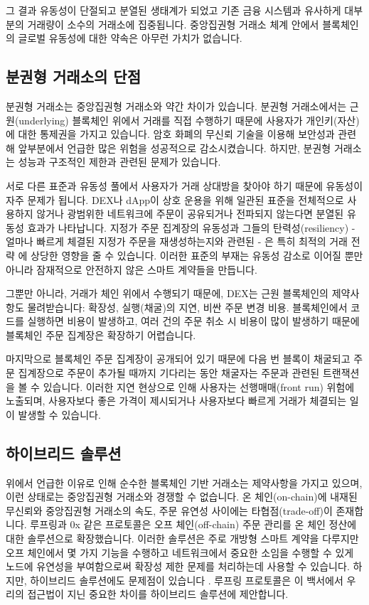 \documentclass[UTF8,nofonts]{article}
\begin{document}
\begin{multicols}{2}
그 결과 유동성이 단절되고 분열된 생태계가 되었고 기존 금융 시스템과 유사하게 대부분의 거래량이 소수의 거래소에 집중됩니다. 중앙집권형 거래소 체계 안에서 블록체인의 글로벌 유동성에 대한 약속은 아무런 가치가 없습니다.  

\subsection{분권형 거래소의 단점}
분권형 거래소는 중앙집권형 거래소와 약간 차이가 있습니다. 분권형 거래소에서는 근원(underlying) 블록체인 위에서 거래를 직접 수행하기 때문에 사용자가 개인키(자산)에 대한 통제권을 가지고 있습니다. 암호 화폐의 무신뢰 기술을 이용해 보안성과 관련해 앞부분에서 언급한 많은 위험을 성공적으로 감소시켰습니다. 하지만, 분권형 거래소는 성능과 구조적인 제한과 관련된 문제가 있습니다.

서로 다른 표준과 유동성 풀에서 사용자가 거래 상대방을 찾아야 하기 때문에 유동성이 자주 문제가 됩니다. DEX나 dApp이 상호 운용을 위해 일관된 표준을 전체적으로 사용하지 않거나 광범위한 네트워크에 주문이 공유되거나 전파되지 않는다면 분열된 유동성 효과가 나타납니다. 지정가 주문 집계장의 유동성과 그들의 탄력성(resiliency) - 얼마나 빠르게 체결된 지정가 주문을 재생성하는지와 관련된 - 은 특히 최적의 거래 전략 \cite{limitorderliquidity} 에 상당한 영향을 줄 수 있습니다. 이러한 표준의 부재는 유동성 감소로 이어질 뿐만 아니라 잠재적으로 안전하지 않은 스마트 계약들을 만듭니다.

그뿐만 아니라, 거래가 체인 위에서 수행되기 때문에, DEX는 근원 블록체인의 제약사항도 물려받습니다: 확장성, 실행(채굴)의 지연, 비싼 주문 변경 비용. 블록체인에서 코드를 실행하면 비용이 발생하고, 여러 건의 주문 취소 시 비용이 많이 발생하기 때문에 블록체인 주문 집계장은 확장하기 어렵습니다.   

마지막으로 블록체인 주문 집계장이 공개되어 있기 때문에 다음 번 블록이 채굴되고 주문 집계장으로 주문이 추가될 때까지 기다리는 동안 채굴자는 주문과 관련된 트랜잭션을 볼 수 있습니다. 이러한 지연 현상으로 인해 사용자는 선행매매(front run) 위험에 노출되며, 사용자보다 좋은 가격이 제시되거나 사용자보다 빠르게 거래가 체결되는 일이 발생할 수 있습니다.

\subsection{하이브리드 솔루션}
위에서 언급한 이유로 인해 순수한 블록체인 기반 거래소는 제약사항을 가지고 있으며, 이런 상태로는 중앙집권형 거래소와 경쟁할 수 없습니다. 온 체인(on-chain)에 내재된 무신뢰와 중앙집권형 거래소의 속도, 주문 유연성 사이에는 타협점(trade-off)이 존재합니다. 루프링과 0x \cite{warren20170x} 같은 프로토콜은 오프 체인(off-chain) 주문 관리를 온 체인 정산에 대한 솔루션으로 확장했습니다. 이러한 솔루션은 주로 개방형 스마트 계약을 다루지만 오프 체인에서 몇 가지 기능을 수행하고 네트워크에서 중요한 소임을 수행할 수 있게 노드에 유연성을 부여함으로써 확장성 제한 문제를 처리하는데 사용할 수 있습니다. 하지만, 하이브리드 솔루션에도 문제점이 있습니다 \cite{costofdecent}. 루프링 프로토콜은 이 백서에서 우리의 접근법이 지닌 중요한 차이를 하이브리드 솔루션에 제안합니다.


\end{multicols}
\end{document}
